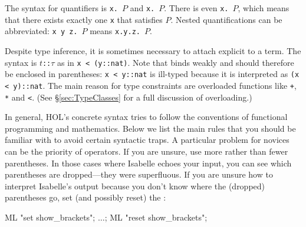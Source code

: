 The syntax for quantifiers is
\texttt{\isasymforall{}x.}~$P$ and
\texttt{\isasymexists{}x.}~$P$.  There is
even \texttt{\isasymuniqex{}x.}~$P$, which
means that there exists exactly one \texttt{x} that satisfies $P$.
Nested quantifications can be abbreviated:
\texttt{\isasymforall{}x~y~z.}~$P$ means
\texttt{\isasymforall{}x.\isasymforall{}y.\isasymforall{}z.}~$P$.

Despite type inference, it is sometimes necessary to attach explicit
 to a term.  The syntax is \texttt{$t$::$\tau$} as
in \texttt{x < (y::nat)}. Note that  binds weakly
and should therefore be enclosed in parentheses: \texttt{x < y::nat} is
ill-typed because it is interpreted as \texttt{(x < y)::nat}. The main reason
for type constraints are overloaded functions like \texttt{+}, \texttt{*} and
\texttt{<}. (See \S\ref{sec:TypeClasses} for a full discussion of
overloading.)

\begin{warn}
In general, HOL's concrete syntax tries to follow the conventions of
functional programming and mathematics. Below we list the main rules that you
should be familiar with to avoid certain syntactic traps. A particular
problem for novices can be the priority of operators. If you are unsure, use
more rather than fewer parentheses. In those cases where Isabelle echoes your
input, you can see which parentheses are dropped---they were superfluous. If
you are unsure how to interpret Isabelle's output because you don't know
where the (dropped) parentheses go, set (and possibly reset) the 
:
\begin{ttbox}
ML "set show_brackets"; \(\dots\); ML "reset show_brackets";
\end{ttbox}
\end{warn}

